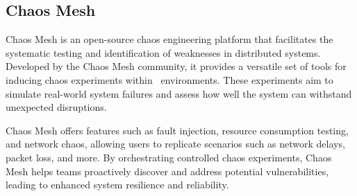 \subsection{Chaos Mesh}
Chaos Mesh is an open-source chaos engineering platform that facilitates the systematic testing and identification of weaknesses in distributed systems. Developed by the Chaos Mesh community, it provides a versatile set of tools for inducing chaos experiments within~ environments. These experiments aim to simulate real-world system failures and assess how well the system can withstand unexpected disruptions.

Chaos Mesh offers features such as fault injection, resource consumption testing, and network chaos, allowing users to replicate scenarios such as network delays, packet loss, and more. By orchestrating controlled chaos experiments, Chaos Mesh helps teams proactively discover and address potential vulnerabilities, leading to enhanced system resilience and reliability.~\cite{noauthor_chaos_nodate}